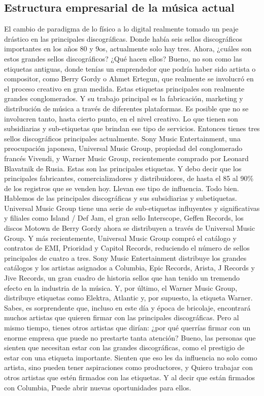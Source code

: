 \documentclass[10pt]{book}
\begin{document}
\subsection{Estructura empresarial de la música actual}
El cambio de paradigma de lo físico a lo digital realmente tomado un peaje drástico en las principales discográficas.  Donde había seis sellos discográficos importantes en los años 80 y 9os, actualmente solo hay tres. Ahora, ¿cuáles son estos grandes sellos discográficos? ¿Qué hacen ellos? Bueno, no son como las etiquetas antiguas, donde tenías un emprendedor que podría haber sido artista o compositor, como Berry Gordy o Ahmet Ertegun, que realmente se involucró en el proceso creativo en gran medida. Estas etiquetas principales son realmente grandes conglomerados. Y su trabajo principal es la fabricación, marketing y distribución de música a través de diferentes plataformas. Es posible que no se involucren tanto, hasta cierto punto, en el nivel creativo. Lo que tienen son subsidiarias y sub-etiquetas que brindan ese tipo de servicios. Entonces tienes tres sellos discográficos principales actualmente. Sony Music Entertainment, una preocupación japonesa, Universal Music Group, propiedad del conglomerado francés Vivendi, y Warner Music Group, recientemente comprado por Leonard Blavatnik de Rusia. Estas son las principales etiquetas. Y debo decir que los principales fabricantes, comercializadores y distribuidores, de hasta el 85 al 90\% de los registros que se venden hoy. Llevan ese tipo de influencia. Todo bien. Hablemos de las principales discográficas y sus subsidiarias y subetiquetas. \\
Universal Music Group tiene una serie de sub-etiquetas influyentes y significativas y filiales como Island / Def Jam, el gran sello Interscope, Geffen Records, los discos Motown de Berry Gordy ahora se distribuyen a través de Universal Music Group. Y más recientemente, Universal Music Group compró el catálogo y contratos de EMI, Prioridad y Capitol Records, reduciendo el número de sellos principales de cuatro a tres. Sony Music Entertainment distribuye los grandes catálogos y los artistas asignados a Columbia, Epic Records, Arista, J Records y Jive Records, un gran cuadro de historia sellos que han tenido un tremendo efecto en la industria de la música. Y, por último, el Warner Music Group, distribuye etiquetas como Elektra, Atlantic y, por supuesto, la etiqueta Warner. Sabes, es sorprendente que, incluso en este día y época de bricolaje, encontrará muchos artistas que quieren firmar con las principales discográficas. Pero al mismo tiempo, tienes otros artistas que dirían: ¿por qué querrías firmar con un enorme empresa que puede no prestarte tanta atención? Bueno, las personas que sienten que necesitan estar con las grandes discográficas, como el prestigio de estar con una etiqueta importante. Sienten que eso les da influencia no solo como artista, sino pueden tener aspiraciones como productores, y Quiero trabajar con otros artistas que estén firmados con las etiquetas. Y al decir que están firmados con Columbia, Puede abrir nuevas oportunidades para ellos.\\
\end{document}
